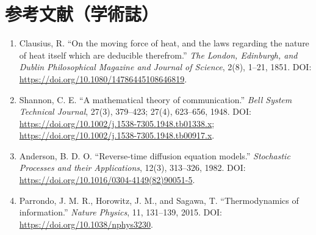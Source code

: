 \section*{参考文献（学術誌）}
\begin{enumerate}[leftmargin=2.4em]
\item Clausius, R. ``On the moving force of heat, and the laws regarding the nature of heat itself which are deducible therefrom.'' \textit{The London, Edinburgh, and Dublin Philosophical Magazine and Journal of Science}, 2(8), 1--21, 1851. DOI: \url{https://doi.org/10.1080/14786445108646819}.
\item Shannon, C. E. ``A mathematical theory of communication.'' \textit{Bell System Technical Journal}, 27(3), 379--423; 27(4), 623--656, 1948. DOI: \url{https://doi.org/10.1002/j.1538-7305.1948.tb01338.x}; \url{https://doi.org/10.1002/j.1538-7305.1948.tb00917.x}.
\item Anderson, B. D. O. ``Reverse-time diffusion equation models.'' \textit{Stochastic Processes and their Applications}, 12(3), 313--326, 1982. DOI: \url{https://doi.org/10.1016/0304-4149(82)90051-5}.
\item Parrondo, J. M. R., Horowitz, J. M., and Sagawa, T. ``Thermodynamics of information.'' \textit{Nature Physics}, 11, 131--139, 2015. DOI: \url{https://doi.org/10.1038/nphys3230}.
\end{enumerate}
